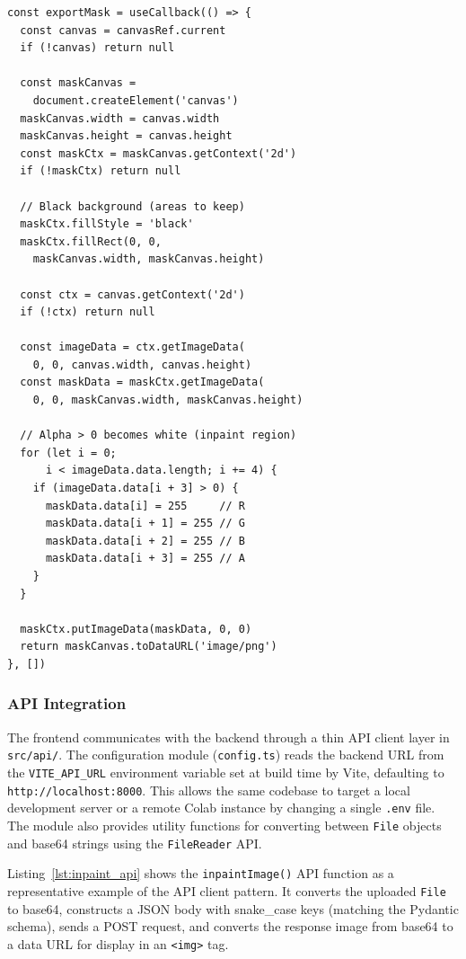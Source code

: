 \documentclass[12pt,a4paper]{report}
\begin{document}
\begin{lstlisting}[language={[LaTeX]TeX}, caption={Mask export function (\texttt{MaskCanvas.tsx})}, label={lst:export_mask}, morekeywords={const,if,return,for,let,function,useCallback,null}]
const exportMask = useCallback(() => {
  const canvas = canvasRef.current
  if (!canvas) return null

  const maskCanvas =
    document.createElement('canvas')
  maskCanvas.width = canvas.width
  maskCanvas.height = canvas.height
  const maskCtx = maskCanvas.getContext('2d')
  if (!maskCtx) return null

  // Black background (areas to keep)
  maskCtx.fillStyle = 'black'
  maskCtx.fillRect(0, 0,
    maskCanvas.width, maskCanvas.height)

  const ctx = canvas.getContext('2d')
  if (!ctx) return null

  const imageData = ctx.getImageData(
    0, 0, canvas.width, canvas.height)
  const maskData = maskCtx.getImageData(
    0, 0, maskCanvas.width, maskCanvas.height)

  // Alpha > 0 becomes white (inpaint region)
  for (let i = 0;
      i < imageData.data.length; i += 4) {
    if (imageData.data[i + 3] > 0) {
      maskData.data[i] = 255     // R
      maskData.data[i + 1] = 255 // G
      maskData.data[i + 2] = 255 // B
      maskData.data[i + 3] = 255 // A
    }
  }

  maskCtx.putImageData(maskData, 0, 0)
  return maskCanvas.toDataURL('image/png')
}, [])
\end{lstlisting}

\subsubsection{API Integration}
\label{sec:api_integration}

The frontend communicates with the backend through a thin API client layer in \texttt{src/api/}. The configuration module (\texttt{config.ts}) reads the backend URL from the \texttt{VITE\_API\_URL} environment variable set at build time by Vite, defaulting to \texttt{http://localhost:8000}. This allows the same codebase to target a local development server or a remote Colab instance by changing a single \texttt{.env} file. The module also provides utility functions for converting between \texttt{File} objects and base64 strings using the \texttt{FileReader} API.

Listing~\ref{lst:inpaint_api} shows the \texttt{inpaintImage()} API function as a representative example of the API client pattern. It converts the uploaded \texttt{File} to base64, constructs a JSON body with snake\_case keys (matching the Pydantic schema), sends a POST request, and converts the response image from base64 to a data URL for display in an \texttt{<img>} tag.
\end{document}
